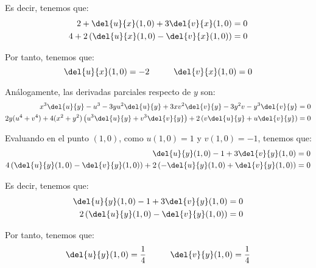 \begin{ejercicio}
    Es decir, tenemos que:
    \begin{align*}
        2 + \del{u}{x}(1,0) + 3\del{v}{x}(1,0) &= 0 \\
        4 + 2\left(\del{u}{x}(1,0) - \del{v}{x}(1,0)\right) &= 0
    \end{align*}

    Por tanto, tenemos que:
    \begin{equation*}
        \del{u}{x}(1,0) = -2 \hspace{1cm}
        \del{v}{x}(1,0) = 0
    \end{equation*}

    Análogamente, las derivadas parciales respecto de $y$ son:
    \begin{align*}
        x^3\del{u}{y} -u^3  -3yu^2\del{u}{y} + 3xv^2\del{v}{y} -3y^2v - y^3\del{v}{y} &= 0 \\
        2y(u^4+v^4) + 4(x^2+y^2)\left(u^3\del{u}{y} + v^3\del{v}{y}\right) + 2\left(v\del{u}{y} + u\del{v}{y}\right) &= 0
    \end{align*}

    Evaluando en el punto $(1,0)$, como $u(1,0)=1$ y $v(1,0)=-1$, tenemos que:
    \begin{align*}
        \del{u}{y}(1,0) -1 + 3\del{v}{y}(1,0) &= 0 \\
        4\left(\del{u}{y}(1,0) -\del{v}{y}(1,0)\right) + 2\left(-\del{u}{y}(1,0) + \del{v}{y}(1,0)\right) &= 0
    \end{align*}

    Es decir, tenemos que:
    \begin{align*}
        \del{u}{y}(1,0) -1 + 3\del{v}{y}(1,0) &= 0 \\
        2\left(\del{u}{y}(1,0) -\del{v}{y}(1,0)\right) &= 0
    \end{align*}

    Por tanto, tenemos que:
    \begin{equation*}
        \del{u}{y}(1,0) = \frac{1}{4} \hspace{1cm}
        \del{v}{y}(1,0) = \frac{1}{4}
    \end{equation*}
\end{ejercicio}



